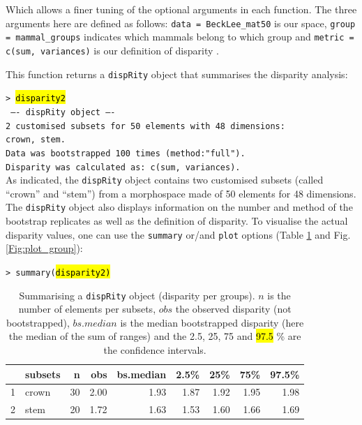 \documentclass[12pt,letterpaper]{article}
\newcommand{\disp}{\texttt{dispRity} }
\begin{document}
\noindent Which allows a finer tuning of the optional arguments in each function.
The three arguments here are defined as follows: \texttt{data = BeckLee\_mat50} is our space, \texttt{group = mammal\_groups} indicates which mammals belong to which group and \texttt{metric = c(sum, variances)} is our definition of disparity \citep{foote1991morphological,Wills1994,Ciampaglio2001}. 

This function returns a \disp object that summarises the disparity analysis:

\noindent \texttt{> \hl{disparity2}}\\
\noindent \texttt{ ---- dispRity object ---- }\\
\noindent \texttt{2 customised subsets for 50 elements with 48 dimensions:}\\
          \texttt{crown, stem.}\\
\noindent \texttt{Data was bootstrapped 100 times (method:"full").}\\
\noindent \texttt{Disparity was calculated as: c(sum, variances).}\\

\bigskip
As indicated, the \disp object contains two customised subsets (called ``crown'' and ``stem'') from a morphospace made of 50 elements for 48 dimensions.
The \disp object also displays information on the number and method of the bootstrap replicates as well as the definition of disparity.
To visualise the actual disparity values, one can use the \texttt{summary} or/and \texttt{plot} options (Table \ref{Tab:summary_group} and Fig. \ref{Fig:plot_group}):



\noindent \texttt{> summary(\hl{disparity2)}}

\begin{table}[ht]
\centering
\begin{tabular}{rlrrrrrrr}
  \hline
 & subsets & n & obs & bs.median & 2.5\% & 25\% & 75\% & 97.5\% \\ 
  \hline
1 & crown &  30 & 2.00 & 1.93 & 1.87 & 1.92 & 1.95 & 1.98 \\ 
  2 & stem &  20 & 1.72 & 1.63 & 1.53 & 1.60 & 1.66 & 1.69 \\ 
   \hline
\end{tabular}
\caption{Summarising a \disp object (disparity per groups). $n$ is the number of elements per subsets, $obs$ the observed disparity (not bootstrapped), $bs.median$ is the median bootstrapped disparity (here the median of the sum of ranges) and the 2.5, 25, 75 and
\hl{97.5}
\% are the confidence intervals.}
\label{Tab:summary_group}
\end{table}
\end{document}
